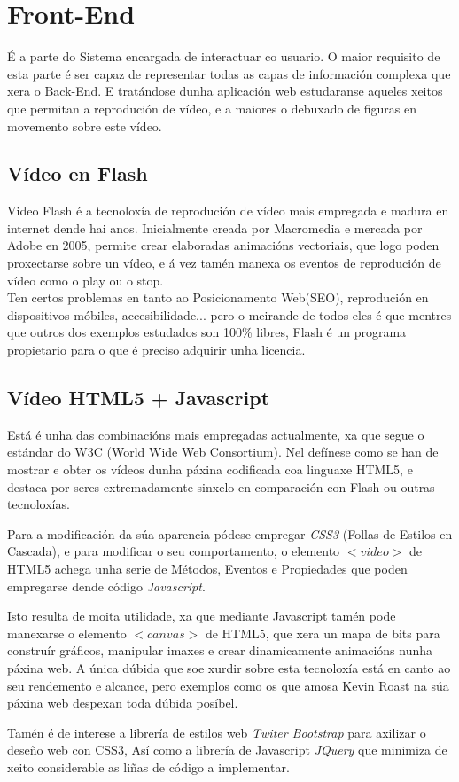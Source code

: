 	
\section{Front-End}
	É a parte do Sistema encargada de interactuar co usuario. O maior requisito de esta 
	parte é ser capaz de representar todas as capas de información complexa que xera o
	Back-End. E tratándose dunha aplicación web estudaranse aqueles xeitos que permitan
	a reprodución de vídeo, e a maiores o debuxado de figuras en movemento sobre este vídeo.
	
	\subsection{Vídeo en Flash}
		Video Flash é a tecnoloxía de reprodución de vídeo mais empregada e madura en
		internet dende hai anos. Inicialmente creada por Macromedia e mercada por Adobe 
		en 2005, permite crear elaboradas animacións vectoriais, que logo poden proxectarse
		sobre un vídeo, e á vez tamén manexa os eventos de reprodución de vídeo como o 
		play ou o stop.\\
		
		Ten certos problemas en tanto ao Posicionamento Web(SEO), reprodución en 
		dispositivos móbiles, accesibilidade... pero o meirande de todos eles é que mentres
		que outros dos exemplos estudados son 100\% libres, Flash é un programa propietario
		para o que é preciso adquirir unha licencia.		
		
	
	\subsection{Vídeo HTML5 + Javascript}
		Está é unha das combinacións mais empregadas actualmente, xa que segue o estándar
		do W3C (World Wide Web Consortium)\cite{w3schools-video-tag}. Nel defínese como se
		han de mostrar e obter os vídeos dunha páxina codificada coa linguaxe HTML5, e 
		destaca por seres extremadamente sinxelo en comparación con Flash ou outras tecnoloxías.
		
		Para a modificación da súa aparencia pódese empregar \emph{CSS3} (Follas de Estilos en 
		Cascada), e para modificar o seu comportamento, o elemento $<video>$ de HTML5 achega
		unha serie de Métodos, Eventos e Propiedades\cite{w3school-video-events} que poden
		empregarse dende código \emph{Javascript}.
		
		Isto resulta de moita utilidade, xa que mediante Javascript tamén pode manexarse o
		elemento $<canvas>$ de HTML5, que xera un mapa de bits para construír gráficos, 
		manipular imaxes e crear dinamicamente animacións nunha páxina web. A única dúbida que
		soe xurdir sobre esta tecnoloxía está en canto ao seu rendemento e alcance, pero
		exemplos como os que amosa Kevin Roast na súa páxina web\cite{kevin-roast-canvas-examples}
		despexan toda dúbida posíbel. 
		
		Tamén é de interese a librería de estilos web \emph{Twiter Bootstrap}
		\cite{bootstrap-page-url} para axilizar o deseño web con CSS3, Así como a 
		librería de Javascript \emph{JQuery} \cite{jquery-page-url} que minimiza de 
		xeito considerable as liñas de código a implementar.